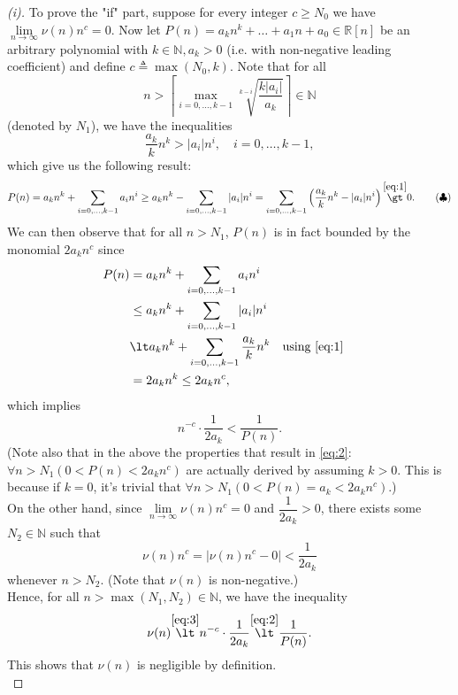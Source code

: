 \begin{proof}[(i)]
    \label{pf:1-i}
    To prove the "if" part, suppose for every integer $c\ge N_0$ we have $\lim\limits_{n\to \infty} \nu(n)n^c=0$. Now let $P(n)=a_k n^k +\ldots+a_1 n+a_0 \in \mathbb{R}[n]$ be an arbitrary polynomial with $k\in \mathbb{N}, a_k \gt 0$ (i.e. with non-negative leading coefficient) and define $c\triangleq \max(N_0, k)$. Note that for all 
    \[ n\gt \left\lceil\max\limits_{i=0,\ldots,k-1} \sqrt[k-i]{\dfrac{k|a_i|}{a_k}}\right\rceil \in \mathbb{N} \]
    (denoted by $N_1$), we have the inequalities
    \[ \label{eq:1}
    \dfrac{a_k}{k}n^k \gt |a_i|n^i, \quad i=0,\ldots,k-1,  \tag{$\ast$}
    \]
    which give us the following result:
    \[\label{eq:4}
    P(n)=a_k n^k+\sum_{i=0,\ldots,k-1} a_i n^i 
    \ge a_k n^k-\sum_{i=0,\ldots,k-1} |a_i| n^i
    = \sum_{i=0,\ldots,k-1} \left(\dfrac{a_k}{k} n^k - |a_i| n^i\right)
    \overset{\eqref{eq:1}}{\gt} 0. \tag{$\clubsuit$}
    \]
    We can then observe that for all $n\gt N_1$, $P(n)$ is in fact bounded by the monomial $2a_kn^c$ since
    \begin{align*}
        P(n) &= a_k n^k+\sum_{i=0,\ldots,k-1} a_i n^i\\
        &\le a_k n^k+\sum_{i=0,\ldots,k-1} |a_i| n^i\\
        &\lt a_k n^k+\sum_{i=0,\ldots,k-1} \dfrac{a_k}{k}n^k && \text{using \eqref{eq:1}}\\
        &= 2a_kn^k \le 2a_kn^c,
    \end{align*}
    which implies 
    \[\label{eq:2} 
    n^{-c}\cdot \dfrac{1}{2a_k}\lt \dfrac{1}{P(n)}. \tag{$\diamond$} 
    \]
    (Note also that in the above the properties that result in \eqref{eq:2}: $\forall n\gt N_1(0\lt P(n)\lt 2a_k n^c)$ are actually derived by assuming $k\gt 0$. This is because if $k=0$, it's trivial that $\forall n\gt N_1(0\lt P(n)=a_k\lt 2a_k n^c)$.)\\
    On the other hand, since $\lim\limits_{n\to \infty} \nu(n)n^c=0$ and $\dfrac{1}{2a_k}\gt 0$, there exists some $N_2\in \mathbb{N}$ such that
    \[\label{eq:3}
    \nu(n)n^c=|\nu(n)n^c-0|\lt \dfrac{1}{2a_k} \tag{$\circ$}
    \]
    whenever $n\gt N_2$. (Note that $\nu(n)$ is non-negative.)\\
    Hence, for all $n\gt \max(N_1, N_2)\in \mathbb{N}$, we have the inequality
    \[
    \nu(n) \overset{\eqref{eq:3}}{\lt} n^{-c}\cdot \dfrac{1}{2a_k} \overset{\eqref{eq:2}}{\lt} \dfrac{1}{P(n)}.
    \]
    This shows that $\nu(n)$ is negligible by definition.\\


\end{proof}
